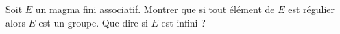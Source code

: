 \begin{exo}
    \label{strictalg1}
    Soit $E$ un magma fini associatif. Montrer que si tout élément de $E$ est régulier alors $E$ est un groupe. Que dire si $E$ est infini ?
\end{exo}